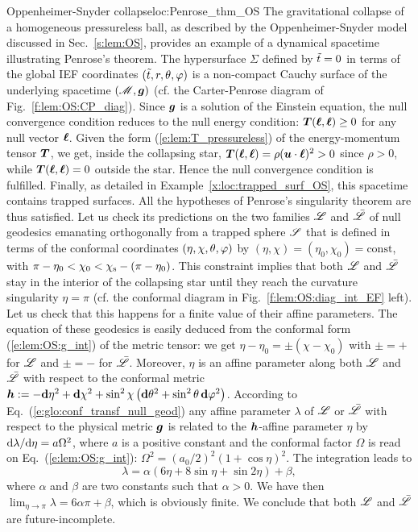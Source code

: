 \begin{texample}{Oppenheimer-Snyder collapse}{loc:Penrose_thm_OS}
The gravitational collapse of a homogeneous pressureless ball, as
described by the Oppenheimer-Snyder model discussed in Sec.~\ref{s:lem:OS},
provides an example of a dynamical spacetime illustrating
Penrose's theorem.
The hypersurface $\Sigma$ defined by ${\tilde t}=0$ in terms of the global
IEF coordinates $({\tilde t}, r, \theta, \varphi)$ is a non-compact Cauchy surface of
the underlying spacetime $(\mathscr{M},\bm{g})$ (cf. the Carter-Penrose diagram
of Fig.~\ref{f:lem:OS:CP_diag}). Since $\bm{g}$ is a solution of the Einstein
equation, the null convergence condition reduces to the null energy condition:
$\bm{T}(\bm{\ell},\bm{\ell}) \geq 0$ for any null vector $\bm{\ell}$.  Given the form
(\ref{e:lem:T_pressureless}) of the energy-momentum tensor $\bm{T}$, we get,
inside the collapsing star,
$\bm{T}(\bm{\ell},\bm{\ell}) = \rho (\bm{u}\cdot\bm{\ell})^2 > 0$ since $\rho > 0$, while
$\bm{T}(\bm{\ell},\bm{\ell}) = 0$ outside the star. Hence the null convergence condition
is fulfilled. Finally, as detailed in Example~\ref{x:loc:trapped_surf_OS},
this spacetime contains trapped surfaces.
All the hypotheses of Penrose's singularity theorem are thus satisfied.
Let us check its predictions on the two families $\mathscr{L}$ and $\bar{\mathscr{L}}$
of null geodesics emanating orthogonally from a trapped
sphere $\mathscr{S}$ that is defined in terms of the conformal coordinates
$(\eta,\chi,\theta,\varphi)$ by $(\eta,\chi) = (\eta_0,\chi_0) = \mathrm{const}$,
with
$\pi - \eta_0 < \chi_0 < \chi_{\rm s} - (\pi - \eta_0)$. This constraint implies
that both $\mathscr{L}$ and $\bar{\mathscr{L}}$
stay in the interior of the collapsing star until they reach
the curvature singularity $\eta=\pi$ (cf. the conformal diagram in
Fig.~\ref{f:lem:OS:diag_int_EF} left). Let us check that this happens for
a finite value of their affine parameters. The equation of these geodesics
is easily deduced from the conformal form (\ref{e:lem:OS:g_int}) of the metric tensor:
we get $\eta - \eta_0 = \pm (\chi - \chi_0)$ with $\pm = +$
for $\mathscr{L}$ and $\pm = -$ for $\bar{\mathscr{L}}$.
Moreover, $\eta$ is an affine parameter
along both $\mathscr{L}$ and $\bar{\mathscr{L}}$ with respect to the conformal metric
 $\bm{h} := - \mathbf{d}\eta^2 + \mathbf{d}\chi^2
        + \sin^2\chi \left( \mathbf{d}\theta^2 + \sin^2\theta\, \mathbf{d}\varphi^2 \right)$.
According to Eq.~(\ref{e:glo:conf_transf_null_geod}) any affine parameter $\lambda$
of $\mathscr{L}$ or $\bar{\mathscr{L}}$ with respect to the physical metric $\bm{g}$ is related
to the $\bm{h}$-affine parameter $\eta$ by $\mathrm{d}\lambda/\mathrm{d}\eta = a \Omega^2$, where $a$
is a positive constant and the
conformal factor $\Omega$ is read on Eq.~(\ref{e:lem:OS:g_int}):
$\Omega^2 = (a_0/2)^2 (1 + \cos\eta)^2$. The integration leads to
\[
    \lambda = \alpha \left( 6 \eta + 8 \sin\eta + \sin 2\eta \right) + \beta ,
\]
where $\alpha$ and $\beta$ are two constants such that $\alpha>0$. We have then
$\lim_{\eta\to\pi} \lambda = 6\alpha\pi + \beta$, which is obviously finite. We conclude that
both $\mathscr{L}$ and $\bar{\mathscr{L}}$ are future-incomplete.
\end{texample}

